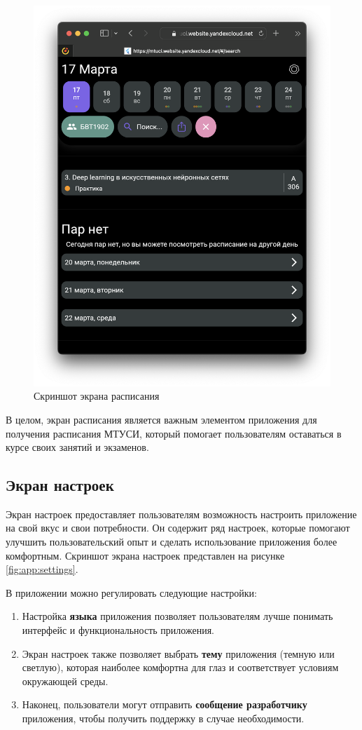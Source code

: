\begin{figure}
\centering
\includegraphics[width=0.5\linewidth]{images/app/rasp.png}
\caption{Скриншот экрана расписания}
\label{fig:app:rasp}
\end{figure}

В целом, экран расписания является важным элементом приложения
для получения расписания МТУСИ, который помогает пользователям оставаться
в курсе своих занятий и экзаменов.

\subsection{Экран настроек}
Экран настроек предоставляет пользователям возможность настроить
приложение на свой вкус и свои потребности.
Он содержит ряд настроек, которые помогают улучшить
пользовательский опыт и сделать использование приложения более комфортным.
Скриншот экрана настроек представлен на рисунке \ref{fig:app:settings}.

В приложении можно регулировать следующие настройки:
\begin{enumerate}
    \item Настройка \textbf{языка} приложения позволяет пользователям лучше понимать интерфейс и функциональность приложения.
    \item Экран настроек также позволяет выбрать \textbf{тему} приложения (темную или светлую),
    которая наиболее комфортна для глаз и соответствует условиям окружающей среды. 
    \item Наконец, пользователи могут отправить \textbf{сообщение разработчику} приложения,
    чтобы получить поддержку в случае необходимости.
\end{enumerate}

